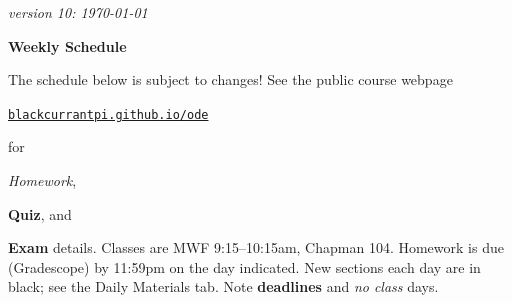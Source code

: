\documentclass[12pt]{article}
\newcommand{\vacinline}[1]{{\color{OliveGreen} \textsl{#1}}}
\newcommand{\due}[1]{\strut {\color{BrickRed} \textsl{#1}}}
\newcommand{\ee}[1]{\strut {\color{Blue} \textbf{#1}}}
\newcommand{\dlinline}[1]{{\color{Purple} \textbf{#1}}}
\begin{document}
\hfill \small \emph{version 10: \today} \normalsize

\bigskip\bigskip
\centerline{\Large \textbf{Weekly Schedule}}

\bigskip
The schedule below is subject to changes!  See the public course webpage

\medskip

\centerline{\href{https://blackcurrantpi.github.io/ode}{\texttt{blackcurrantpi.github.io/ode}}}

\noindent for \due{Homework}, \ee{Quiz}, and \ee{Exam} details.  Classes are MWF 9:15--10:15am, Chapman 104.  Homework is due (Gradescope) by 11:59pm on the day indicated.  New sections each day are in black; see the Daily Materials tab.  Note \dlinline{deadlines} and \vacinline{no class} days.

\bigskip
\end{document}
